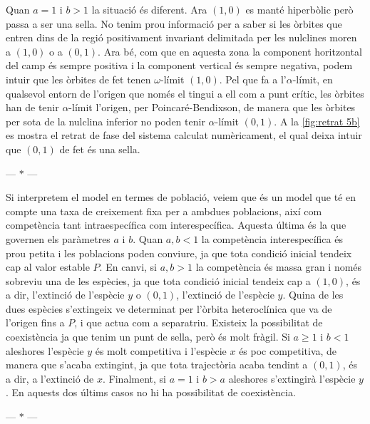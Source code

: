 \documentclass[12pt]{article}
\numberwithin{table}{section}
\numberwithin{equation}{section}
\numberwithin{figure}{section}
\newcommand{\parbreak}{
	\begin{center}
		--- $\ast$ ---
	\end{center} 
}
\begin{document}
Quan \( a = 1 \) i \( b > 1 \) la situació és diferent. Ara \( (1,0) \) es manté hiperbòlic però passa a ser una sella. No tenim prou informació per a saber si les òrbites que entren dins de la regió positivament invariant delimitada per les nulclines moren a \( (1,0) \) o a \( (0,1) \). Ara bé, com que en aquesta zona la component horitzontal del camp és sempre positiva i la component vertical és sempre negativa, podem intuir que les òrbites de fet tenen \( \omega \)-límit \( (1,0) \). Pel que fa a l'\( \alpha \)-límit, en qualsevol entorn de l'origen que només el tingui a ell com a punt crític, les òrbites han de tenir \( \alpha \)-límit l'origen, per Poincaré-Bendixson, de manera que les òrbites per sota de la nulclina inferior no poden tenir \( \alpha \)-límit \( (0,1) \). A la \cref{fig:retrat 5b} es mostra el retrat de fase del sistema calculat numèricament, el qual deixa intuir que \( (0,1) \) de fet és una sella.

\parbreak 

Si interpretem el model en termes de població, veiem que és un model que té en compte una taxa de creixement fixa per a ambdues poblacions, així com competència tant intraespecífica com interespecífica. Aquesta última és la que governen els paràmetres \( a \) i \( b \). Quan \( a,b < 1 \) la competència interespecífica és prou petita i les poblacions poden conviure, ja que tota condició inicial tendeix cap al valor estable \( P \). En canvi, si \( a, b > 1 \) la competència és massa gran i només sobreviu una de les espècies, ja que tota condició inicial tendeix cap a \( (1,0) \), és a dir, l'extinció de l'espècie \( y \) o \( (0,1) \), l'extinció de l'espècie \( y \). Quina de les dues espècies s'extingeix ve determinat per l'òrbita heteroclínica que va de l'origen fins a \( P \), i que actua com a separatriu. Existeix la possibilitat de coexistència ja que tenim un punt de sella, però és molt fràgil. Si \( a \geq 1 \) i \( b < 1 \) aleshores l'espècie \( y \) és molt competitiva i l'espècie \( x \) és poc competitiva, de manera que s'acaba extingint, ja que tota trajectòria acaba tendint a \( (0,1) \), és a dir, a l'extinció de \( x \). Finalment, si	\( a = 1 \) i \( b > a \) aleshores s'extingirà l'espècie \( y \). En aquests dos últims casos no hi ha possibilitat de coexistència. 

\parbreak
\end{document}
